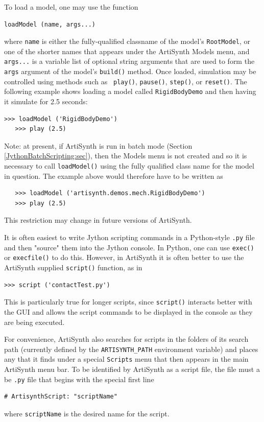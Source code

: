\documentclass{article}
\begin{document}
To load a model, one may use the function
%
\begin{lstlisting}[]
  loadModel (name, args...)
\end{lstlisting}
%
where {\tt name} is either the fully-qualified classname of the
model's {\tt RootModel}, or one of the shorter names that appears
under the ArtiSynth {\sf Models} menu, and {\tt args...} is a variable
list of optional string arguments that are used to form the {\tt args}
argument of the model's {\tt build()} method.
Once loaded, simulation may be controlled using methods such as {\tt
play()}, {\tt pause()}, {\tt step()}, or {\tt reset()}. The following
example shows loading a model called {\tt RigidBodyDemo} and
then having it simulate for 2.5 seconds:
%
\begin{lstlisting}[]
   >>> loadModel ('RigidBodyDemo')
   >>> play (2.5)
\end{lstlisting}
%
\begin{sideblock}
Note: at present, if ArtiSynth is run in batch mode (Section
\ref{JythonBatchScripting:sec}), then the {\sf Models} menu is not
created and so it is necessary to call {\tt loadModel()} using
the fully qualified class name for the model in question. The example
above would therefore have to be written as
%
\begin{verbatim}
   >>> loadModel ('artisynth.demos.mech.RigidBodyDemo')
   >>> play (2.5)
\end{verbatim}
%
This restriction may change in future versions of ArtiSynth.
\end{sideblock}
%
It is often easiest to write Jython scripting commands in a
Python-style {\tt .py} file and then "source" them into the Jython
console. In Python, one can use {\tt exec()} or {\tt execfile()} to do
this. However, in ArtiSynth it is often better to use the ArtiSynth
supplied {\tt script()} function, as in
%
\begin{lstlisting}[]
   >>> script ('contactTest.py')
\end{lstlisting}
%
This is particularly true for longer scripts, since {\tt script()}
interacts better with the GUI and allows the script commands to be
displayed in the console as they are being executed.

For convenience, ArtiSynth also searches for scripts in the folders of
its search path (currently defined by the {\tt ARTISYNTH\_PATH}
environment variable) and places any that it finds under a special
{\tt Scripts} menu that then appears in the main ArtiSynth menu
bar. To be identified by ArtiSynth as a script file, the file must a
be {\tt .py} file that begins with the special first line
%
\begin{lstlisting}[]
# ArtisynthScript: "scriptName"
\end{lstlisting}
%
where {\tt scriptName} is the desired name for the script.
\end{document}
